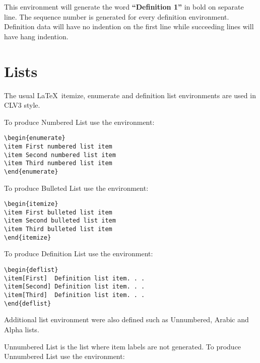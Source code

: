 \documentclass{clv3}
\begin{document}
This environment will generate the word {\bf ``Definition 1''} in bold on separate
line. The sequence number is generated for every definition environment. Definition
data will have no indention on the first line while succeeding lines will have hang
indention.

\section{Lists}

The usual \LaTeX\ itemize, enumerate and definition list environments are used
in CLV3 style.

To produce Numbered List use the environment:

\begin{verbatim}
\begin{enumerate}
\item First numbered list item
\item Second numbered list item
\item Third numbered list item
\end{enumerate}
\end{verbatim}

To produce Bulleted List use the environment:

\begin{verbatim}
\begin{itemize}
\item First bulleted list item
\item Second bulleted list item
\item Third bulleted list item
\end{itemize}
\end{verbatim}

To produce Definition List use the environment:

\begin{verbatim}
\begin{deflist}
\item[First]  Definition list item. . .
\item[Second] Definition list item. . .
\item[Third]  Definition list item. . .
\end{deflist}
\end{verbatim}

Additional list environment were also defined such as Unnumbered, Arabic and Alpha lists.

Unnumbered List is the list where item labels are not generated. To produce Unnumbered List use the environment:
\end{document}
